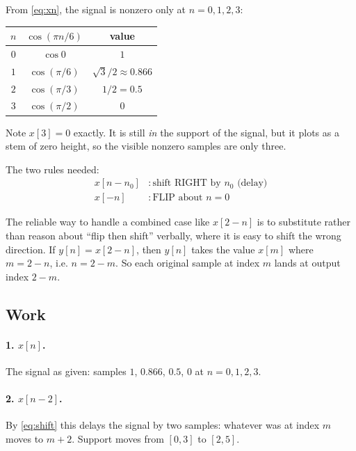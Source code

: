 From \eqref{eq:xn}, the signal is nonzero only at $n = 0,1,2,3$:

\begin{center}
\begin{tabular}{ccc}
  \toprule
  $n$ & $\cos(\pi n/6)$ & value \\
  \midrule
  $0$ & $\cos 0$        & $1$ \\
  $1$ & $\cos(\pi/6)$   & $\sqrt{3}/2 \approx 0.866$ \\
  $2$ & $\cos(\pi/3)$   & $1/2 = 0.5$ \\
  $3$ & $\cos(\pi/2)$   & $0$ \\
  \bottomrule
\end{tabular}
\end{center}

Note $x[3] = 0$ exactly. It is still \emph{in} the support of the signal, but it
plots as a stem of zero height, so the visible nonzero samples are only three.

The two rules needed:
\begin{align}
  x[n - n_0] &: \text{shift RIGHT by } n_0 \text{ (delay)} \label{eq:shift}\\
  x[-n]      &: \text{FLIP about } n = 0 \label{eq:flip}
\end{align}

The reliable way to handle a combined case like $x[2-n]$ is to substitute rather
than reason about ``flip then shift'' verbally, where it is easy to shift the
wrong direction. If $y[n] = x[2-n]$, then $y[n]$ takes the value $x[m]$ where
$m = 2-n$, i.e. $n = 2-m$. So each original sample at index $m$ lands at output
index $2-m$.

\subsection*{Work}

\paragraph{1. $x[n]$.}
The signal as given: samples $1$, $0.866$, $0.5$, $0$ at $n = 0,1,2,3$.

\begin{center}
\end{center}

\paragraph{2. $x[n-2]$.}
By \eqref{eq:shift} this delays the signal by two samples: whatever was at index
$m$ moves to $m+2$. Support moves from $[0,3]$ to $[2,5]$.

